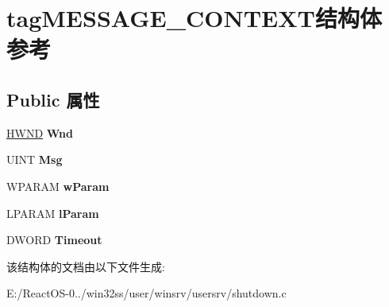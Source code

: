 \hypertarget{structtag_m_e_s_s_a_g_e___c_o_n_t_e_x_t}{}\section{tag\+M\+E\+S\+S\+A\+G\+E\+\_\+\+C\+O\+N\+T\+E\+X\+T结构体 参考}
\label{structtag_m_e_s_s_a_g_e___c_o_n_t_e_x_t}
\subsection*{Public 属性}
\begin{DoxyCompactItemize}
\item 
\mbox{\label{structtag_m_e_s_s_a_g_e___c_o_n_t_e_x_t_a3470f4807486e45c2374cf16cddc62f9}} 
\hyperlink{interfacevoid}{H\+W\+ND} {\bfseries Wnd}
\item 
\mbox{\label{structtag_m_e_s_s_a_g_e___c_o_n_t_e_x_t_a8e7f097fd271aabdabfca3a44e7abc24}} 
U\+I\+NT {\bfseries Msg}
\item 
\mbox{\label{structtag_m_e_s_s_a_g_e___c_o_n_t_e_x_t_a81d0c323260f0831ff007a38dc43159a}} 
W\+P\+A\+R\+AM {\bfseries w\+Param}
\item 
\mbox{\label{structtag_m_e_s_s_a_g_e___c_o_n_t_e_x_t_a5a83ecdc430f85793c8f90e032160c8e}} 
L\+P\+A\+R\+AM {\bfseries l\+Param}
\item 
\mbox{\label{structtag_m_e_s_s_a_g_e___c_o_n_t_e_x_t_a53e3ac73b6214eea3ae7e2130fda0d94}} 
D\+W\+O\+RD {\bfseries Timeout}
\end{DoxyCompactItemize}


该结构体的文档由以下文件生成\+:\begin{DoxyCompactItemize}
\item 
E\+:/\+React\+O\+S-\/0../win32ss/user/winsrv/usersrv/shutdown.\+c\end{DoxyCompactItemize}
